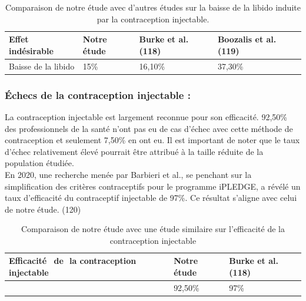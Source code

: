 \begin{table}[H]
  \centering
  \renewcommand{\arraystretch}{1.5}

  \begin{spacing}{1.5} %
  \begin{tabularx}{\textwidth}{|p{3.4cm}|X|p{3.7cm}|p{4.5cm}|}
      \hline
      \textbf{Effet indésirable} & \textbf{Notre étude } & \textbf{Burke et al. (118)} & \textbf{Boozalis et al. (119)}\\
      \hline
      Baisse de la libido & 15\% & 16,10\%  & 37,30\%\\
      
      
      \hline
  \end{tabularx}
\end{spacing}
\captionsetup{justification=centering} %
\caption{Comparaison de notre étude avec d’autres études sur la baisse de la libido induite par la contraception injectable.}

\end{table}

\subsubsection{Échecs de la contraception injectable : }

La contraception injectable est largement reconnue pour son efficacité. 92,50\% des professionnels de la santé n’ont pas eu de cas d’échec avec cette méthode de contraception et seulement 7,50\% en ont eu. Il est important de noter que le taux d'échec relativement élevé pourrait être attribué à la taille réduite de la population étudiée. \\

\noindent En 2020, une recherche menée par Barbieri et al., se penchant sur la simplification des critères contraceptifs pour le programme iPLEDGE, a révélé un taux d'efficacité du contraceptif injectable de 97\%. Ce résultat s'aligne avec celui de notre étude. (120)

\begin{table}[H]
  \centering
  \renewcommand{\arraystretch}{1.5}

  \begin{spacing}{1.5} %
  \begin{tabularx}{\textwidth}{|p{6cm}|X|X|}
      \hline
      \textbf{Efficacité \,\,\,de \,\,la \newline contraception injectable} & \textbf{Notre étude } & \textbf{Burke et al. (118)} \\
      \hline
     & 92,50\% & 97\% \\
      
      
      \hline
  \end{tabularx}
\end{spacing}
\captionsetup{justification=centering} %
\caption{Comparaison de notre étude avec une étude similaire sur l’efficacité de la contraception injectable}

\end{table}

